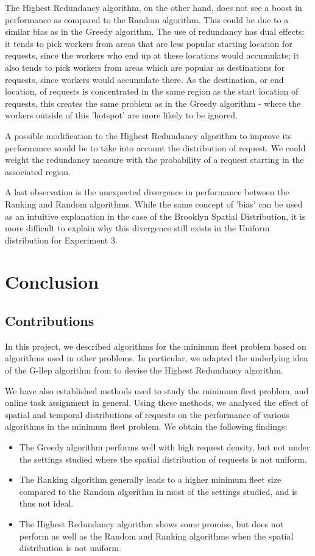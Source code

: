 \documentclass[urop]{socreport}
\begin{document}
The Highest Redundancy algorithm, on the other hand, does not see a boost in performance as compared to the Random algorithm. This could be due to a similar bias as in the Greedy algorithm. The use of redundancy has dual effects: it tends to pick workers from areas that are less popular starting location for requests, since the workers who end up at these locations would accumulate; it also tends to pick workers from areas which are popular as destinations for requests, since workers would accumulate there. As the destination, or end location, of requests is concentrated in the same region as the start location of requests, this creates the same problem as in the Greedy algorithm - where the workers outside of this 'hotspot' are more likely to be ignored.

A possible modification to the Highest Redundancy algorithm to improve its performance would be to take into account the distribution of request. We could weight the redundancy measure with the probability of a request starting in the associated region.

A last observation is the unexpected divergence in performance between the Ranking and Random algorithms. While the same concept of 'bias' can be used as an intuitive explanation in the case of the Brooklyn Spatial Distribution, it is more difficult to explain why this divergence still exists in the Uniform distribution for Experiment 3.

\chapter{Conclusion}
\label{ch:con}
\section{Contributions}
In this project, we described algorithms for the minimum fleet problem based on algorithms used in other problems. In particular, we adapted the underlying idea of the G-llep algorithm from \cite{kazemi} to devise the Highest Redundancy algorithm.

We have also established methods used to study the minimum fleet problem, and online task assignment in general. Using these methods, we analysed the effect of spatial and temporal distributions of requests on the performance of various algorithms in the minimum fleet problem. We obtain the following findings:

\begin{itemize}
    \item The Greedy algorithm performs well with high request density, but not under the settings studied where the spatial distribution of requests is not uniform. 
    \item The Ranking algorithm generally leads to a higher minimum fleet size compared to the Random algorithm in most of the settings studied, and is thus not ideal.
    \item The Highest Redundancy algorithm shows some promise, but does not perform as well as the Random and Ranking algorithms when the spatial distribution is not uniform.
\end{itemize}
\end{document}

